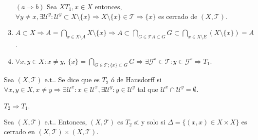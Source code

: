 \begin{dem}
  \begin{enumerate}[label=(\roman*)]
    \item []
    \item [$  (a \Rightarrow b)$] Sea $X T_{1}, x \in X$ entonces, $\forall y \neq x, \exists \mathcal{U}^{y}: \mathcal{U}^{y} \subset X \setminus \{ x \} \Rightarrow X \setminus \{ x \} \in \mathcal{T} \Rightarrow \{ x \}$ es cerrado de $( X, \mathcal{T} )$.
    \item $A \subset X \Rightarrow A = \bigcap_{x \in X \setminus A} X \setminus \{ x \} \Rightarrow A \subset \bigcap_{G \in \mathcal{T} A \subset G} G \subset \bigcap_{x \in X \setminus E} (X \setminus \{ x \}) = A$.
    \item $\forall x, y \in X : x \neq y$, $\{ x \} = \bigcap_{G \in \mathcal{T}; \{ x \} \subset G} G \Rightarrow \exists \mathcal{G}^{x} \in \mathcal{T} : y \in \mathcal{G}^{x} \Rightarrow T_{1}$.
  \end{enumerate}
\end{dem}

\begin{defn}
  Sea $( X, \mathcal{T} )$ e.t.. Se dice que es $T_{2}$ ó de Hausdorff si $\forall x, y \in X, x \neq y \Rightarrow \exists \mathcal{U}^{x}: x \in \mathcal{U}^{x}, \exists \mathcal{U}^{y}: y \in \mathcal{U}^{y}$ tal que $\mathcal{U}^{x} \cap \mathcal{U}^{y} = \emptyset$.
\end{defn}

\begin{obs}
  $T_{2} \Rightarrow T_{1}$.
\end{obs}

\begin{prop}
  Sea $ ( X, \mathcal{T} )$ e.t.. Entonces, $( X, \mathcal{T} )$ es $T_{2}$ si y solo si $ \Delta = \{  (x,x) \in X \times X \}$ es cerrado en $( X, \mathcal{T} ) \times ( X, \mathcal{T} )$.
\end{prop}


